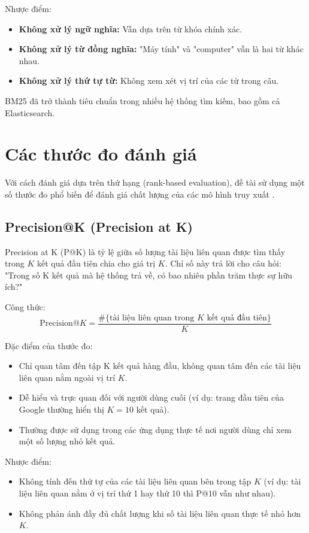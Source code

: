 \documentclass[../BTL.tex]{subfiles}
\begin{document}
Nhược điểm:
\begin{itemize}
    \item \textbf{Không xử lý ngữ nghĩa:} Vẫn dựa trên từ khóa chính xác.
    
    \item \textbf{Không xử lý từ đồng nghĩa:} "Máy tính" và "computer" vẫn là hai từ khác nhau.
    
    \item \textbf{Không xử lý thứ tự từ:} Không xem xét vị trí của các từ trong câu.
\end{itemize}

BM25 đã trở thành tiêu chuẩn trong nhiều hệ thống tìm kiếm, bao gồm cả Elasticsearch.

\section{Các thước đo đánh giá}
Với cách đánh giá dựa trên thứ hạng (rank-based evaluation), đề tài sử dụng một số thước đo phổ biến để đánh giá chất lượng của các mô hình truy xuất \cite{manning2008introduction}.

\subsection{Precision@K (Precision at K)}
Precision at K (P@K) là tỷ lệ giữa số lượng tài liệu liên quan được tìm thấy trong $K$ kết quả đầu tiên chia cho giá trị $K$. Chỉ số này trả lời cho câu hỏi: "Trong số K kết quả mà hệ thống trả về, có bao nhiêu phần trăm thực sự hữu ích?"

Công thức:
$$
\mathrm{Precision}@K = \frac{\#\{\text{tài liệu liên quan trong } K \text{ kết quả đầu tiên}\}}{K}
$$

Đặc điểm của thước đo:
\begin{itemize}
    \item Chỉ quan tâm đến tập K kết quả hàng đầu, không quan tâm đến các tài liệu liên quan nằm ngoài vị trí $K$.
    
    \item Dễ hiểu và trực quan đối với người dùng cuối (ví dụ: trang đầu tiên của Google thường hiển thị $K=10$ kết quả).
    
    \item Thường được sử dụng trong các ứng dụng thực tế nơi người dùng chỉ xem một số lượng nhỏ kết quả.
\end{itemize}

Nhược điểm:
\begin{itemize}
    \item Không tính đến thứ tự của các tài liệu liên quan bên trong tập $K$ (ví dụ: tài liệu liên quan nằm ở vị trí thứ 1 hay thứ 10 thì P@10 vẫn như nhau).
    
    \item Không phản ánh đầy đủ chất lượng khi số tài liệu liên quan thực tế nhỏ hơn $K$.
\end{itemize}
\end{document}
